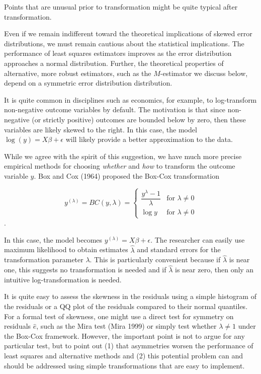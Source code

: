\documentclass[10pt]{article}
\begin{document}
Points that are unusual prior to transformation might be quite typical after transformation.

Even if we remain indifferent toward the theoretical implications of skewed error distributions, we must remain cautious about the statistical implications. The performance of least squares estimators improves as the error distribution approaches a normal distribution. Further, the theoretical properties of alternative, more robust estimators, such as the $M$-estimator we discuss below, depend on a symmetric error distribution distribution.

It is quite common in disciplines such as economics, for example, to log-transform non-negative outcome variables by default. The motivation is that since non-negative (or strictly positive) outcomes are bounded below by zero, then these variables are likely skewed to the right. In this case, the model $\log(y) = X\beta + \epsilon$ will likely provide a better approximation to the data.

While we agree with the spirit of this suggestion, we have much more precise empirical methods for choosing \textit{whether} and \textit{how} to transform the outcome variable $y$. Box and Cox (1964) proposed the Box-Cox transformation 

\begin{displaymath}
   y^{(\lambda)} = BC(y, \lambda) = \left\{
     \begin{array}{lr}
       \dfrac{y^\lambda - 1}{\lambda} & \text{for } \lambda \neq 0\\
       \log y & \text{for } \lambda \neq 0
     \end{array}
   \right.
\end{displaymath}.

\noindent In this case, the model becomes $y^{(\lambda)} = X\beta + \epsilon$. The researcher can easily use maximum likelihood to obtain estimates $\hat{\lambda}$ and standard errors for the transformation parameter $\lambda$. This is particularly convenient because if $\hat{\lambda}$ is near one, this suggests no transformation is needed and if $\hat{\lambda}$ is near zero, then only an intuitive log-transformation is needed.

It is quite easy to assess the skewness in the residuals using a simple histogram of the residuals or a QQ plot of the residuals compared to their normal quantiles. For a formal test of skewness, one might use a direct test for symmetry on residuals $\hat{e}$, such as the Mira test (Mira 1999) or simply test whether $\lambda \neq 1$ under the Box-Cox framework. However, the important point is not to argue for any particular test, but to point out (1) that asymmetries worsen the performance of least squares and alternative methods and (2) this potential problem can and should be addressed using simple transformations that are easy to implement.
\end{document}
